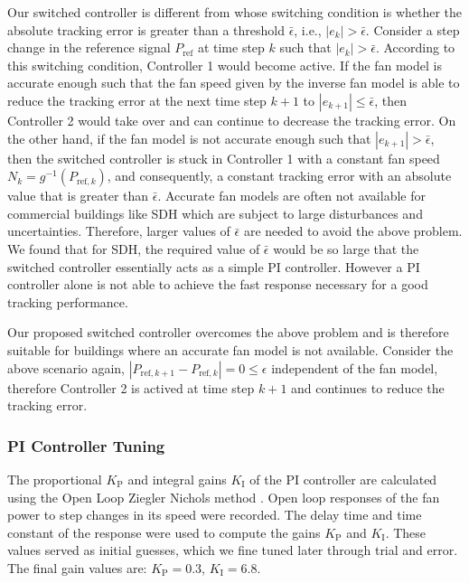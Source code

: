 Our switched controller is different from \cite{Vrettos:2016flexlab1} whose switching condition is whether the absolute tracking error is greater than a threshold $\bar{\epsilon}$, i.e., $|e_k|>\bar{\epsilon}$. 
Consider a step change in the reference signal $P_{\text{ref}}$ at time step $k$ such that $|e_k|>\bar{\epsilon}$. 
According to this switching condition, Controller 1 would become active. 
If the fan model is accurate enough such that the fan speed given by the inverse fan model is able to reduce the tracking error at the next time step $k+1$ to $|e_{k+1}| \leq \bar{\epsilon}$, then Controller 2 would take over and can continue to decrease the tracking error. 
On the other hand, if the fan model is not accurate enough such that $|e_{k+1}| > \bar{\epsilon}$, then the switched controller is stuck in Controller 1 with a constant fan speed $N_k = g^{-1}(P_{\text{ref},k})$, %
and consequently, a constant tracking error with an absolute value that is greater than $\bar{\epsilon}$.
Accurate fan models are often not available for commercial buildings like SDH which are subject to large disturbances and uncertainties. 
Therefore, larger values of $\bar{\epsilon}$ are needed to avoid the above problem. 
We found that for SDH, the required value of $\bar{\epsilon}$ would be so large that the switched controller essentially acts as a simple PI controller. 
However a PI controller alone is not able to achieve the fast response necessary for a good tracking performance.%

Our proposed switched controller overcomes the above problem and is therefore suitable for buildings where an accurate fan model is not available. Consider the above scenario again, $|P_{\text{ref},k+1} - P_{\text{ref},k}| = 0 \leq \epsilon$ independent of the fan model, therefore Controller 2 is actived at time step $k+1$ and continues to reduce the tracking error.





\subsubsection{PI Controller Tuning}\label{sec:PItuning}
The proportional $K_\text{P}$ and integral gains $K_\text{I}$ of the PI controller are calculated using the %
Open Loop Ziegler Nichols method \cite{Moderncontrol_book}. Open loop responses of the fan power to step changes in its speed were recorded. 
The delay time and time constant of the response were used to compute the gains $K_\text{P}$ and $K_\text{I}$.
These values served as initial guesses, which we fine tuned later through trial and error. 
The final gain values are: $K_\text{P} = 0.3$, $K_\text{I} = 6.8$.

